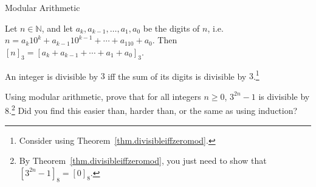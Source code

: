 \begin{section}{Modular Arithmetic}
\begin{theorem}
Let $n\in \mathbb{N}$, and let $a_k, a_{k-1}, \ldots, a_1, a_0$ be the digits of $n$, i.e. $n=a_k10^k + a_{k-1}10^{k-1} + \cdots + a_110 + a_0$. Then $[n]_3 =  [a_k + a_{k-1} + \cdots + a_1 + a_0]_3$.
\end{theorem}

\begin{theorem}
An integer is divisible by $3$ iff the sum of its digits is divisible by $3$.\footnote{Consider using Theorem~\ref{thm.divisibleiffzeromod}.}
\end{theorem}


\begin{exercise}
Using modular arithmetic, prove that for all integers $n \ge 0$, $3^{2n}-1$ is divisible by $8$.\footnote{By Theorem~\ref{thm.divisibleiffzeromod}, you just need to show that $[3^{2n}-1]_8 = [0]_8$.} Did you find this easier than, harder than, or the same as using induction?
\end{exercise}







\end{section}